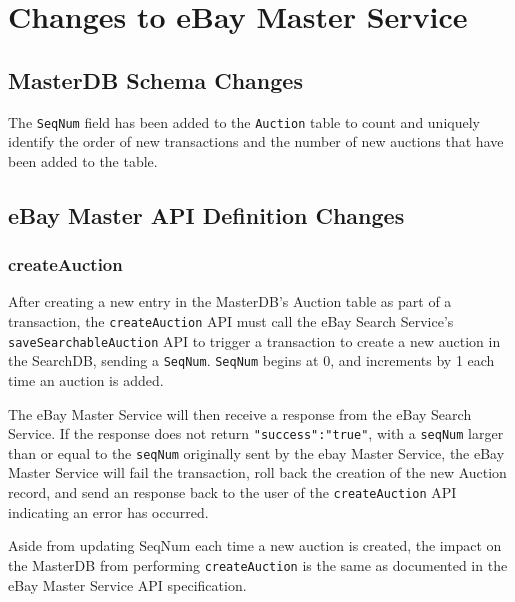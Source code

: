 \documentclass[12pt,a4paper]{article}
\begin{document}
\pagebreak
\section{Changes to eBay Master Service}

\subsection{MasterDB Schema Changes}
The \texttt{SeqNum} field has been added to the \texttt{Auction} table to count and
uniquely identify the order of new transactions and the number of new auctions 
that have been added to the table. 


\subsection{eBay Master API Definition Changes}

\subsubsection{createAuction}
After creating a new entry in the MasterDB's Auction table as part of a transaction, 
the \texttt{createAuction} API must call the eBay Search Service's 
\texttt{saveSearchableAuction} API to trigger a transaction to create 
a new auction in the SearchDB, sending a \texttt{SeqNum}.
\texttt{SeqNum} begins at 0, and increments by 1 each time an auction is added.

\vspace{\baselineskip}
The eBay Master Service will then receive a response from the eBay Search Service. 
If the response does not return \texttt{"success":"true"}, with a \texttt{seqNum}
larger than or equal to the \texttt{seqNum} originally sent by the ebay Master Service, 
the eBay Master Service will fail the transaction, roll back the creation of the new Auction record, 
and send an response back to the user of the \texttt{createAuction} API 
indicating an error has occurred.


\vspace{\baselineskip}
Aside from updating SeqNum each time a new auction is created, the 
impact on the MasterDB from performing \texttt{createAuction} is the same as 
documented in the eBay Master Service API specification.

\end{document}
